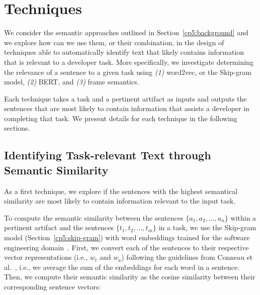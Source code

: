\clearpage

\section{Techniques}
\label{cp5:approaches}





We consider the semantic approaches outlined in Section~\ref{cp5:background} and we explore 
how can we use them, or their combination, in the design of techniques able to automatically identify text that likely contains information that is relevant to a developer task. 
More specifically, we investigate determining the relevance of a sentence to a given task using 
\textit{(1)} word2vec, or the Skip-gram model, \textit{(2)} BERT, and \textit{(3)} frame semantics.

    




Each technique takes a task and a pertinent artifact as inputs and outputs the sentences that are most likely to contain information that assists a developer in completing that task.
We present details for each technique in the following sections.




\subsection{Identifying Task-relevant Text through Semantic Similarity}
\label{cp5:approach-w2v}


As a first technique, we explore if the sentences with the highest semantical similarity are most likely to contain information relevant to the input task. 


To compute the semantic similarity between the sentences $\{a_1, a_2, \dots, a_n\}$ within a pertinent artifact and the sentences $\{t_1, t_2, \dots, t_m\}$ in a task, 
we use the Skip-gram model (Section~\ref{cp5:skip-gram}) with word embeddings trained for the software engineering domain~\cite{Efstathiou2018}. 
First, we convert each of the sentences to their respective vector representations (i.e., $w_t$ and $w_a$) following the guidelines from Conneau et al.~\cite{conneau2018}, i.e., we average the sum of the embeddings for each word in a sentence.
Then, we compute their semantic similarity as the cosine similarity  between their corresponding sentence vectors:


